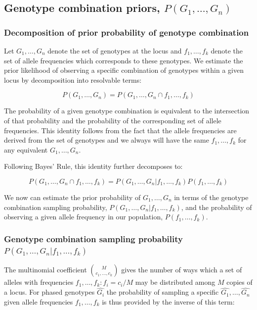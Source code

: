\documentclass{article}
\begin{document}
\subsection{Genotype combination priors, $P(G_1,\ldots,G_n)$}

\subsubsection{Decomposition of prior probability of genotype combination}

Let $G_1,\ldots,G_n$ denote the set of genotypes at the locus and $f_1,\ldots,f_k$ denote the set of allele frequencies which corresponds to these genotypes.  We estimate the prior likelihood of observing a specific combination of genotypes within a given locus by decomposition into resolvable terms:

\begin{equation}
P(G_1,\ldots,G_n) = P(G_1,\ldots,G_n \cap f_1,\ldots,f_k)
\end{equation}

The probability of a given genotype combination is equivalent to the intersection of that probability and the probability of the corresponding set of allele frequencies.  This identity follows from the fact that the allele frequencies are derived from the set of genotypes and we always will have the same $f_1,\ldots,f_k$ for any equivalent $G_1,\ldots,G_n$.

Following Bayes' Rule, this identity further decomposes to:

\begin{equation}
P(G_1,\ldots,G_n \cap f_1,\ldots,f_k) = P(G_1,\ldots,G_n | f_1,\ldots,f_k) P(f_1,\ldots,f_k)
\end{equation}

We now can estimate the prior probability of $G_1,\ldots,G_n$ in terms of the genotype combination sampling probability, $P(G_1,\ldots,G_n | f_1,\ldots,f_k)$, and the probability of observing a given allele frequency in our population, $P(f_1,\ldots,f_k)$.

\subsubsection{Genotype combination sampling probability $P(G_1,\ldots,G_n | f_1,\ldots,f_k)$}

The multinomial coefficient ${M \choose c_1,\ldots,c_k }$ gives the number of ways which a set of alleles with frequencies $f_1,\ldots,f_k : f_i = c_i/M$ may be distributed among $M$ copies of a locus.  For phased genotypes $\hat{G_i}$ the probability of sampling a specific $\hat{G_1},\ldots,\hat{G_n}$ given allele frequencies $f_1,\ldots,f_k$ is thus provided by the inverse of this term:
\end{document}
